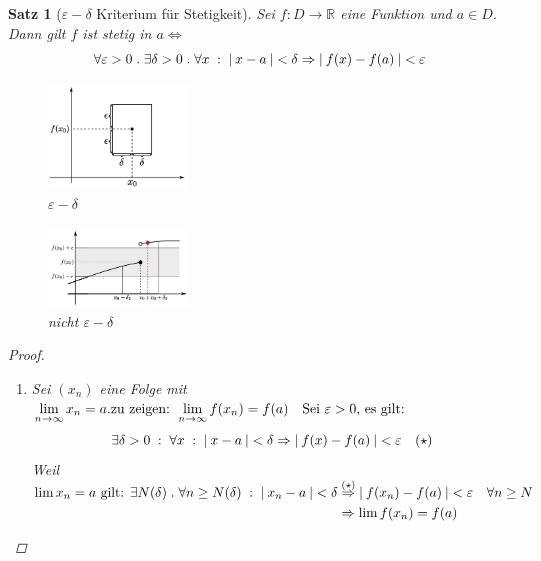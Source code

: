 \documentclass[a4paper,titlepage,oneside]{article}
\def\R{\ensuremath{\mathbb{R}} }
\renewcommand{\epsilon}{\ensuremath{\varepsilon} }
\def\zz{\text{zu zeigen: }}
\def\sp{\hspace{0,1cm}}
\def\spdot{\sp.\sp}
\def\spcolon{\sp:\sp}
\renewcommand{\liminf}[2][n]{\ensuremath{\lim\limits_{#1 \rightarrow \infty}{#2}}}
\newcommand{\abs}[1]{\ensuremath{\left|\:#1\:\right|}}
\theoremstyle{thmstyle}
\newtheorem{satz}{Satz}[section]
\theoremstyle{subthmstyle}
\begin{document}
\begin{satz}[$\epsilon-\delta$ Kriterium für Stetigkeit]
Sei $f: D \to \R$ eine Funktion und $a \in D$. Dann gilt $f$ ist stetig in $a \Leftrightarrow$
\[\forall \epsilon > 0 \spdot \exists \delta > 0 \spdot \forall x \spcolon \abs{x-a} < \delta \Rightarrow \abs{f(x) - f(a)} < \epsilon\]
\begin{figure}[ht]\centering
 \includegraphics[width=0.33\textwidth]{images/deltaepsilonkrit.png}
\caption{$\epsilon-\delta$}
\end{figure}
\begin{figure}[ht]\centering
 \includegraphics[width=0.33\textwidth]{images/nichtdeltaepsilonkrit.png}
\caption{nicht $\epsilon-\delta$}
\end{figure}

\begin{proof}\sp
\begin{enumerate}
\item[$\Leftarrow$:] Sei $(x_n)$ eine Folge mit $\liminf{x_n} = a. \\
\zz \liminf{f(x_n)} =  f(a)\quad \text{Sei } \epsilon > 0 \text{, es gilt: }$
\[\exists \delta > 0 \spcolon  \forall x \spcolon \abs{x-a} < \delta \Rightarrow \abs{f(x) - f(a)} < \epsilon \quad (\star)\]
Weil $\begin{aligned}[t] \lim{x_n} = a \text{ gilt: } \exists N(\delta) \spdot \forall n \ge N(\delta) \spcolon \abs{x_n - a} < \delta &\overset{(\star)}{\Rightarrow} \abs{f(x_n) - f(a)} < \epsilon \quad \forall n \ge N \\
&\Rightarrow \lim{f(x_n)} = f(a)\end{aligned}$


\end{enumerate}
\end{proof}
\end{satz}
\end{document}
